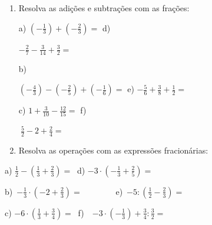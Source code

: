 \documentclass[12pt]{article}
\renewcommand{\_}{\kern-1.5pt\textunderscore\kern-1.5pt}
\begin{document}
\vspace{\baselineskip}
\begin{enumerate}
	\item Resolva as adições e subtrações com as frações:\par

a)\textbf{  \(  \left( -\frac{1}{3} \right) + \left( -\frac{2}{3} \right) = \) \tab \tab \tab }d){\fontsize{16pt}{19.2pt}\selectfont   \( -\frac{2}{7}-\frac{3}{14}+\frac{3}{2}= \) \par}\par

b){\fontsize{16pt}{19.2pt}\selectfont   \(  \left( -\frac{4}{3} \right) - \left( -\frac{2}{5} \right) + \left( -\frac{1}{6} \right) = \) \tab e)  \( -\frac{5}{6}+\frac{3}{8}+\frac{1}{2}= \) \par}\par

c)  \( 1+\frac{3}{10}-\frac{12}{15}= \) \tab \tab \tab f){\fontsize{16pt}{19.2pt}\selectfont   \( ~\frac{5}{2}-2+\frac{2}{4}= \) \par}\par


\vspace{\baselineskip}
	\item Resolva as operações com as expressões fracionárias:
\end{enumerate}\par

\begin{adjustwidth}{0.25in}{0.0in}
a)\textbf{  \( \frac{1}{2}- \left( \frac{1}{3}+\frac{2}{3} \right) =~  \) \tab \tab \tab }d)\textbf{  \( -3 \cdot  \left( -\frac{1}{3}+\frac{2}{5} \right) =~  \) \tab }\par

\end{adjustwidth}

\begin{adjustwidth}{0.25in}{0.0in}
b)\   \( -\frac{1}{3} \cdot  \left( -2+\frac{2}{3} \right) =~  \) \ \ \ \ \ \ \  \tab \tab e)\   \( -5: \left( \frac{1}{2}-\frac{2}{3} \right) =~~  \) \par

\end{adjustwidth}

\begin{adjustwidth}{0.25in}{0.0in}
c)  \( -6 \cdot  \left( \frac{1}{3}+\frac{3}{4} \right) =~  \) \tab \tab \tab f)\ \   \( -3 \cdot  \left( -\frac{1}{3} \right) +\frac{3}{4}:\frac{3}{2}=~  \) \ \ \ \ \ \ \  \par

\end{adjustwidth}
\end{document}
